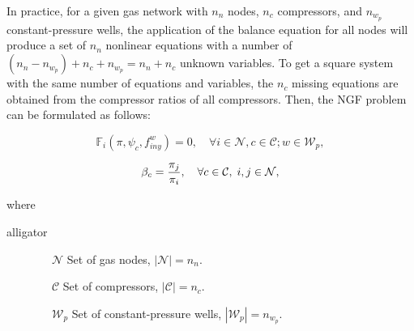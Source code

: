In practice, for a given gas network with $n_n$ nodes, $n_c$ compressors, and $n_{w_p}$ constant-pressure wells, the application of the balance equation for all nodes will produce a set of $n_n$ nonlinear equations with a number of $(n_n-n_{w_p})+n_c+n_{w_p} = n_n+n_c$ unknown variables. To get a square system with the same number of equations and variables, the $n_c$ missing equations are obtained from the compressor ratios of all compressors. Then, the NGF problem can be formulated as follows:

\begin{equation}
	\label{eq:F_i=0}
	\mathbb{F}_i\left(\pi,\psi_c,f_{iny}^{w}\right) = 0, \quad \forall i\in\mathcal{N}, c\in\mathcal{C}; w\in\mathcal{W}_p, 	
\end{equation}

\begin{equation}
	\label{eq:R_c=0}
	\beta_c = \frac{\pi_j}{\pi_i}, \quad \forall c\in\mathcal{C}, \;  i,j\in\mathcal{N},
	\vspace{0.3cm}
\end{equation}

where

\begin{labeling}{alligator}
	\item [$\qquad \qquad  \mathcal{N}$]  \hspace{0.85cm} Set of gas nodes, $|\mathcal{N}|=n_n$.
	\item [$\qquad \qquad  \mathcal{C}$]  \hspace{1cm} Set of compressors, $|\mathcal{C}|=n_c$. 
	\item [$\qquad \qquad  \mathcal{W}_p$] \hspace{0.65cm} Set of constant-pressure wells, $|\mathcal{W}_p|=n_{w_p}$.	
\end{labeling}



